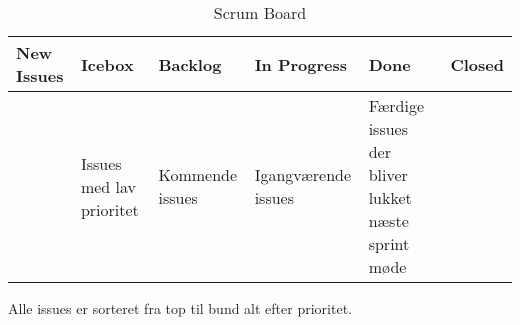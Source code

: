 \begin{table}[ht]
    \begin{tabularx}{\textwidth}{|X|X|X|X|X|X|}
    \hline
    \textbf{New Issues} & \textbf{Icebox} & \textbf{Backlog} & \textbf{In Progress} & \textbf{Done} & \textbf{Closed} \\ \hline
     & Issues med lav prioritet & Kommende issues & Igangværende issues & Færdige issues der bliver lukket næste sprint møde & \\ \hline
    \end{tabularx}
    \caption{Scrum Board}
    \label{tab:scrumboard}
\end{table} 

\noindent
Alle issues er sorteret fra top til bund alt efter prioritet. \\

\newpage
